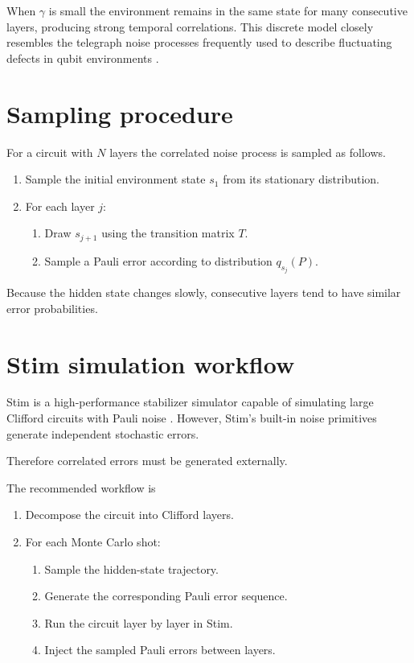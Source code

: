 \documentclass[11pt]{article}
\begin{document}
When $\gamma$ is small the environment remains in the same state for many consecutive layers, producing strong temporal correlations. 
This discrete model closely resembles the telegraph noise processes frequently used to describe fluctuating defects in qubit environments \cite{paladino2014}.

\section{Sampling procedure}

For a circuit with $N$ layers the correlated noise process is sampled as follows.

\begin{enumerate}
\item Sample the initial environment state $s_1$ from its stationary distribution.
\item For each layer $j$:
\begin{enumerate}
\item Draw $s_{j+1}$ using the transition matrix $T$.
\item Sample a Pauli error according to distribution $q_{s_j}(P)$.
\end{enumerate}
\end{enumerate}

Because the hidden state changes slowly, consecutive layers tend to have similar error probabilities.

\section{Stim simulation workflow}

Stim is a high-performance stabilizer simulator capable of simulating large Clifford circuits with Pauli noise \cite{gidney2021}. 
However, Stim's built-in noise primitives generate independent stochastic errors.

Therefore correlated errors must be generated externally.

The recommended workflow is

\begin{enumerate}
\item Decompose the circuit into Clifford layers.
\item For each Monte Carlo shot:
\begin{enumerate}
\item Sample the hidden-state trajectory.
\item Generate the corresponding Pauli error sequence.
\item Run the circuit layer by layer in Stim.
\item Inject the sampled Pauli errors between layers.
\end{enumerate}
\end{enumerate}
\end{document}

